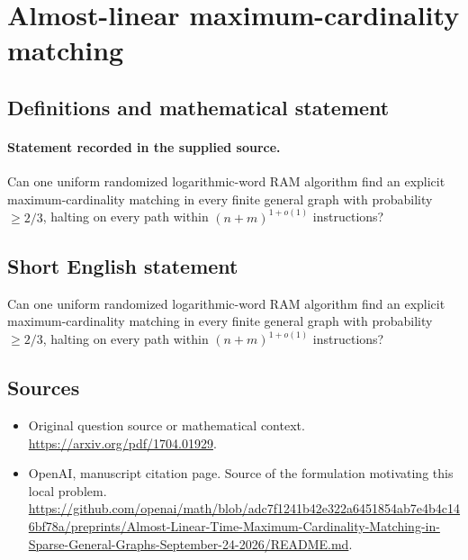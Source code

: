 \documentclass[11pt]{article}
\begin{document}
\section*{Almost-linear maximum-cardinality matching}\label{statement}
\subsection{Definitions and mathematical statement}
\paragraph{Statement recorded in the supplied source.}
Can one uniform randomized logarithmic-word RAM algorithm find an explicit maximum-cardinality matching in every finite general graph with probability $\geq 2/3$, halting on every path within $(n+m)^{1+o(1)}$ instructions?
\subsection{Short English statement}
Can one uniform randomized logarithmic-word RAM algorithm find an explicit maximum-cardinality matching in every finite general graph with probability $\geq 2/3$, halting on every path within $(n+m)^{1+o(1)}$ instructions?
\subsection{Sources}
\begin{itemize}
\item[S1] Original question source or mathematical context.
\url{https://arxiv.org/pdf/1704.01929}.
\item[S2] OpenAI, manuscript citation page. Source of the formulation motivating this local problem.
\url{https://github.com/openai/math/blob/adc7f1241b42e322a6451854ab7e4b4c146bf78a/preprints/Almost-Linear-Time-Maximum-Cardinality-Matching-in-Sparse-General-Graphs-September-24-2026/README.md}.
\end{itemize}
\end{document}
